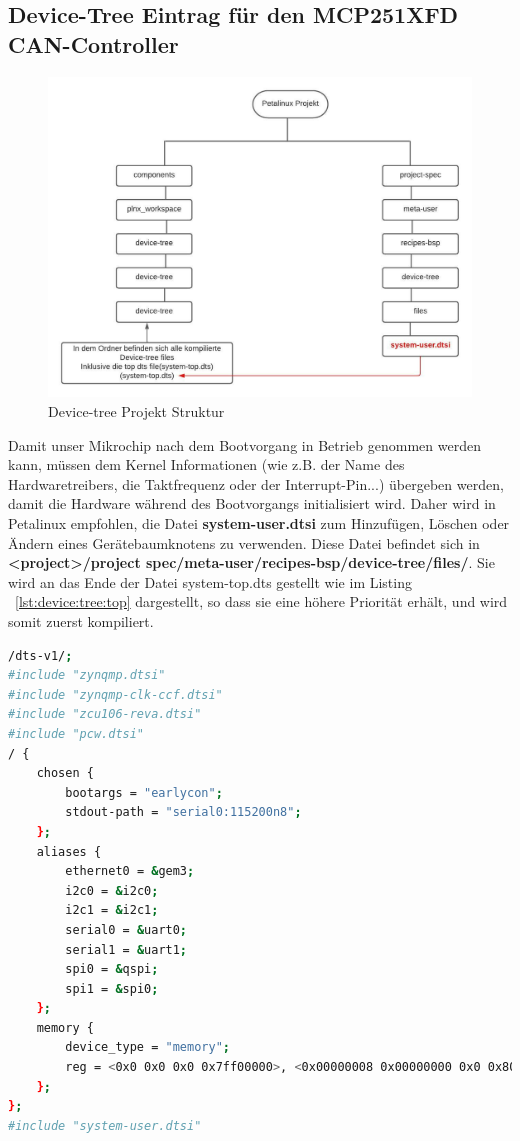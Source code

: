 \subsection{Device-Tree Eintrag für den MCP251XFD CAN-Controller }
\begin{figure}[H]
	\begin{center}		\includegraphics[width=1\textwidth]{./images/device-tree-diagram.jpg}
	\end{center}
	\vspace{-5pt}
	\caption[Device-tree Projekt Struktur]{Device-tree Projekt Struktur} %
	\label{fig:deviceTree:struktur}
	\vspace{-5pt}
\end{figure}

Damit unser Mikrochip nach dem Bootvorgang in Betrieb genommen werden kann, müssen dem Kernel Informationen (wie z.B. der Name des Hardwaretreibers, die Taktfrequenz oder der Interrupt-Pin...) übergeben werden, damit die Hardware während des Bootvorgangs initialisiert wird. Daher wird in Petalinux empfohlen, die Datei \textbf{system-user.dtsi} zum Hinzufügen, Löschen oder Ändern eines Gerätebaumknotens zu verwenden. Diese Datei befindet sich in \textbf{<project>/project spec/meta-user/recipes-bsp/device-tree/files/}. Sie wird an das Ende der Datei system-top.dts gestellt wie im Listing ~\ref{lst:device:tree:top} dargestellt, so dass sie eine höhere Priorität erhält, und wird somit zuerst kompiliert.


\begin{lstlisting}[backgroundcolor = \color{lightgray},basicstyle=\scriptsize\ttfamily,caption={Inhalt der system-top.dts Datei},label=lst:device:tree:top,language=bash,framexleftmargin = 2em]
/dts-v1/;
#include "zynqmp.dtsi"
#include "zynqmp-clk-ccf.dtsi"
#include "zcu106-reva.dtsi"
#include "pcw.dtsi"
/ {
	chosen {
		bootargs = "earlycon";
		stdout-path = "serial0:115200n8";
	};
	aliases {
		ethernet0 = &gem3;
		i2c0 = &i2c0;
		i2c1 = &i2c1;
		serial0 = &uart0;
		serial1 = &uart1;
		spi0 = &qspi;
		spi1 = &spi0;
	};
	memory {
		device_type = "memory";
		reg = <0x0 0x0 0x0 0x7ff00000>, <0x00000008 0x00000000 0x0 0x80000000>;
	};
};
#include "system-user.dtsi"	
\end{lstlisting}

